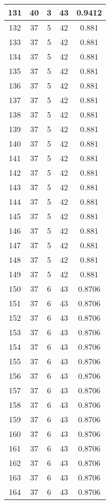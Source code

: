 \documentclass[letterpaper, 12pt]{article}
\begin{document}
\begin{longtable}{|c|c|c|c|c|}
\hline
131 & 40 & 3 & 43 & 0.9412 \\
\hline
132 & 37 & 5 & 42 & 0.881 \\
\hline
133 & 37 & 5 & 42 & 0.881 \\
\hline
134 & 37 & 5 & 42 & 0.881 \\
\hline
135 & 37 & 5 & 42 & 0.881 \\
\hline
136 & 37 & 5 & 42 & 0.881 \\
\hline
137 & 37 & 5 & 42 & 0.881 \\
\hline
138 & 37 & 5 & 42 & 0.881 \\
\hline
139 & 37 & 5 & 42 & 0.881 \\
\hline
140 & 37 & 5 & 42 & 0.881 \\
\hline
141 & 37 & 5 & 42 & 0.881 \\
\hline
142 & 37 & 5 & 42 & 0.881 \\
\hline
143 & 37 & 5 & 42 & 0.881 \\
\hline
144 & 37 & 5 & 42 & 0.881 \\
\hline
145 & 37 & 5 & 42 & 0.881 \\
\hline
146 & 37 & 5 & 42 & 0.881 \\
\hline
147 & 37 & 5 & 42 & 0.881 \\
\hline
148 & 37 & 5 & 42 & 0.881 \\
\hline
149 & 37 & 5 & 42 & 0.881 \\
\hline
150 & 37 & 6 & 43 & 0.8706 \\
\hline
151 & 37 & 6 & 43 & 0.8706 \\
\hline
152 & 37 & 6 & 43 & 0.8706 \\
\hline
153 & 37 & 6 & 43 & 0.8706 \\
\hline
154 & 37 & 6 & 43 & 0.8706 \\
\hline
155 & 37 & 6 & 43 & 0.8706 \\
\hline
156 & 37 & 6 & 43 & 0.8706 \\
\hline
157 & 37 & 6 & 43 & 0.8706 \\
\hline
158 & 37 & 6 & 43 & 0.8706 \\
\hline
159 & 37 & 6 & 43 & 0.8706 \\
\hline
160 & 37 & 6 & 43 & 0.8706 \\
\hline
161 & 37 & 6 & 43 & 0.8706 \\
\hline
162 & 37 & 6 & 43 & 0.8706 \\
\hline
163 & 37 & 6 & 43 & 0.8706 \\
\hline
164 & 37 & 6 & 43 & 0.8706 \\

\end{longtable}
\end{document}
